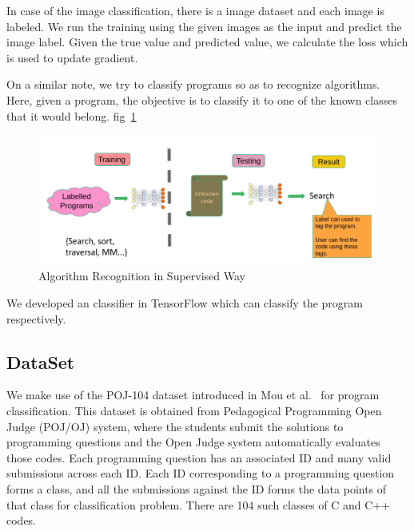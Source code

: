In case of the image classification, there is a image dataset and each image is labeled. We run the training using the given images as the input and predict the image label. Given the true value and predicted value, we calculate the loss which is used to update gradient.

On a similar note, we try to classify programs so as to recognize algorithms. Here, given a program, the objective is to classify it to one of the known classes that it would belong. fig~\ref{fig:supervised-background}

\begin{figure}[t]
    \centering
    \includegraphics[scale=0.4]{figures/chapter-3/supervised_introduction.png}
    \caption{Algorithm Recognition in Supervised Way}
     \label{fig:supervised-background}
\end{figure}


We developed an classifier in TensorFlow\cite{tensorflow2015-whitepaper} which can classify the program respectively. 
\subsection{DataSet}

We make use of the POJ-104 dataset introduced in Mou et al.~\cite{tbcnn-aaai16} for program classification. This dataset is obtained from Pedagogical Programming Open Judge (POJ/OJ) system, where the students submit the solutions to programming questions and the Open Judge system automatically evaluates those codes. 
Each programming question has an associated ID and many valid submissions across each ID. 
Each ID corresponding to a programming question forms a class, and all the submissions against the ID forms the data points of that class for classification problem. There are 104 such classes of C and C++ codes.

